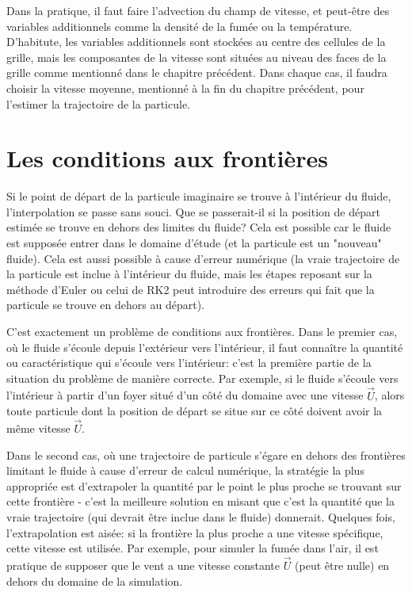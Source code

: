 \documentclass[11pt]{report}
\begin{document}
Dans la pratique, il faut faire l'advection du champ de vitesse, et peut-être des variables additionnels comme la densité de la fumée ou la température. D'habitute, les variables additionnels sont stockées au centre des cellules de la grille, mais les composantes de la vitesse sont situées au niveau des faces de la grille comme mentionné dans le chapitre précédent. Dans chaque cas, il faudra choisir la vitesse moyenne, mentionné à la fin du chapitre précédent, pour l'estimer la trajectoire de la particule.


\section{Les conditions aux frontières}

Si le point de départ de la particule imaginaire se trouve à l'intérieur du fluide, l'interpolation se passe sans souci. Que se passerait-il si la position de départ estimée se trouve en dehors des limites du fluide? Cela est possible car le fluide est supposée entrer dans le domaine d'étude (et la particule est un "nouveau" fluide). Cela est aussi possible à cause d'erreur numérique (la vraie trajectoire de la particule est inclue à l'intérieur du fluide, mais les étapes reposant sur la méthode d'Euler ou celui de RK2 peut introduire des erreurs qui fait que la particule se trouve en dehors au départ).\newline

C'est exactement un problème de conditions aux frontières. Dans le premier cas, où le fluide s'écoule depuis l'extérieur vers l'intérieur, il faut connaître la quantité ou caractéristique qui s'écoule vers l'intérieur: c'est la première partie de la situation du problème de manière correcte. Par exemple, si le fluide s'écoule vers l'intérieur à partir d'un foyer situé d'un côté du domaine avec une vitesse $\overrightarrow{U}$, alors toute particule dont la position de départ se situe sur ce côté doivent avoir la même vitesse $\overrightarrow{U}$.\newline

Dans le second cas, où une trajectoire de particule s'égare en dehors des frontières limitant le fluide à cause d'erreur de calcul numérique, la stratégie la plus appropriée est d'extrapoler la quantité par le point le plus proche se trouvant sur cette frontière - c'est la meilleure solution en misant que c'est la quantité que la vraie trajectoire (qui devrait être inclue dans le fluide) donnerait. Quelques fois, l'extrapolation est aisée: si la frontière la plus proche a une vitesse spécifique, cette vitesse est utilisée. Par exemple, pour simuler la fumée dans l'air, il est pratique de supposer que le vent a une vitesse constante $\overrightarrow{U}$ (peut être nulle) en dehors du domaine de la simulation.\newline
\end{document}
